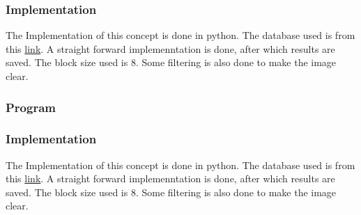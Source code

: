 \documentclass{beamer}
\begin{document}

\begin{frame}
\frametitle{Implementation}
The Implementation of this concept is done in python. The database used is from this \href{http://vision.middlebury.edu/stereo/data/}{link}. A straight forward implemenntation is done, after which results are saved. The block size used is 8. Some filtering is also done to make the image clear.
\end{frame}


\begin{frame}[shrink=20]
\frametitle{Program}

\end{frame}


\begin{frame}
\frametitle{Implementation}
The Implementation of this concept is done in python. The database used is from this \href{http://vision.middlebury.edu/stereo/data/}{link}. A straight forward implemenntation is done, after which results are saved. The block size used is 8. Some filtering is also done to make the image clear.
\end{frame}

\end{document}
